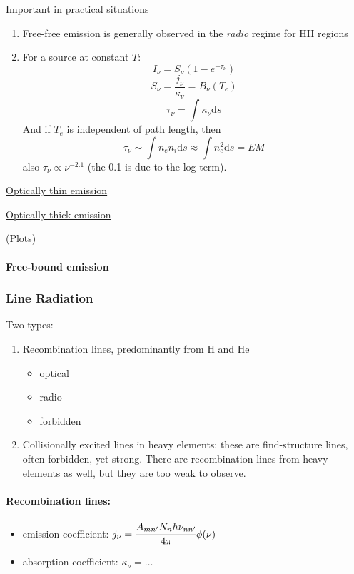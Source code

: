 \documentclass[11pt]{article}
\newcommand{\mar}[1]{\hspace{0pt}\marginpar{-\textcolor{black}{#1}-}}
\begin{document}
\mar{65}

\underline{Important in practical situations}
\begin{enumerate}
    \item Free-free emission is generally observed in the \emph{radio} regime
        for HII regions
    \item For a source at constant $T$:
        \[
            I_{\nu} = S_{\nu} \left( 1 - e^{-\tau_{\nu}} \right)
            \]
        \[
            S_{\nu} = \frac{j_{\nu}}{\kappa_{\nu}} = B_{\nu} (T_{e})
            \]
        \[
            \tau_{\nu} = \int \kappa_{\nu} \mathrm{d}s
            \]
        And if $T_{e}$ is independent of path length, then
        \[
            \tau_{\nu}
            \sim \int n_{e}n_{i} \mathrm{d}s
            \approx \int n_{e}^{2} \mathrm{d}s
            = EM
            \]
        also $\tau_{\nu} \propto \nu^{-2.1} $ (the 0.1 is due to the log term).
\end{enumerate}

\underline{Optically thin emission}

\underline{Optically thick emission}

\mar{66}(Plots)

\mar{67}

\paragraph{Free-bound emission}
\mar{68}

\subsubsection{Line Radiation}
\mar{69}Two types:
\begin{enumerate}
    \item Recombination lines, predominantly from H and He
        \begin{itemize}
            \item optical
            \item radio
            \item forbidden
        \end{itemize}
    \item Collisionally excited lines in heavy elements; these are find-structure
        lines, often forbidden, yet strong. There are recombination lines from
        heavy elements as well, but they are too weak to observe.
\end{enumerate}

\paragraph{Recombination lines:}
\begin{itemize}
    \item emission coefficient:
        $ j_{\nu} = \cfrac{A_{mn'} N_{n} h\nu_{nn'}}{4\pi} \phi(\nu) $
    \item absorption coefficient:
        $ \kappa_{\nu} = \ldots $
\end{itemize}
\end{document}
